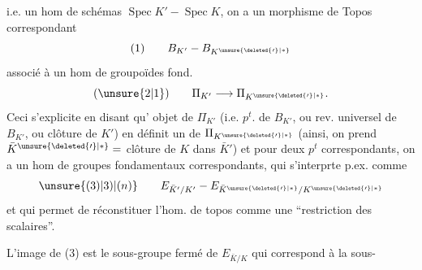 i.e. un hom de schémas $\operatorname{Spec}K' - \operatorname{Spec}K$, on a un morphisme de Topos correspondant
\[
(1)\qquad B_{K'}-B_{K^{\unsure{\deleted{\prime}|*}}}
\]
associé à un hom de groupoïdes fond.
\[
(\unsure{2|1})\qquad \Pi_{K'}\longrightarrow\Pi_{K^{\unsure{\deleted{\prime}|*}}}.
\]
Ceci s'explicite en disant qu'  objet de $\Pi_{K'}$ (i.e. $p^t$. de $B_{K'}$, ou rev. universel de $B_{K'}$, \deleted{)} ou clôture  de $K'$) en définit un de $\Pi_{K^{\unsure{\deleted{\prime}|*}}}$ (ainsi, on prend $\bar K^{\unsure{\deleted{\prime}|*}}=$ clôture   de $K$ dans $\bar K'$) et pour deux $p^t$ correspondants, on a un hom de groupes fondamentaux correspondants, qui s'interprte p.ex. comme
\[
\unsure{(3)|3)|(n)}\qquad E_{\bar K'/K'}-E_{\bar K^{\unsure{\deleted{\prime}|*}}/K^{\unsure{\deleted{\prime}|*}}}
\]
et qui permet de réconstituer l'hom. de topos comme une ``restriction des scalaires''.

L'image de (3) est le sous-groupe fermé de $E_{\bar K/K}$ qui correspond à la sous-
